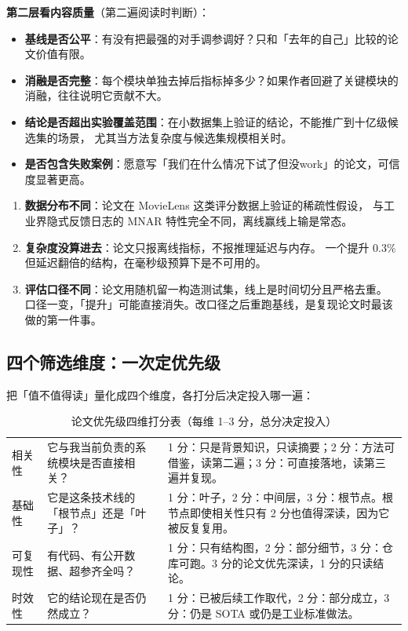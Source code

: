 \textbf{第二层看内容质量}（第二遍阅读时判断）：

\begin{itemize}
  \item \textbf{基线是否公平}：有没有把最强的对手调参调好？只和「去年的自己」比较的论文价值有限。
  \item \textbf{消融是否完整}：每个模块单独去掉后指标掉多少？如果作者回避了关键模块的消融，往往说明它贡献不大。
  \item \textbf{结论是否超出实验覆盖范围}：在小数据集上验证的结论，不能推广到十亿级候选集的场景，
        尤其当方法复杂度与候选集规模相关时。
  \item \textbf{是否包含失败案例}：愿意写「我们在什么情况下试了但没work」的论文，可信度显著更高。
\end{itemize}

\begin{pitfall}
\begin{enumerate}
  \item \textbf{数据分布不同}：论文在 MovieLens 这类评分数据上验证的稀疏性假设，
        与工业界隐式反馈日志的 MNAR 特性完全不同，离线赢线上输是常态。
  \item \textbf{复杂度没算进去}：论文只报离线指标，不报推理延迟与内存。
        一个提升 0.3\%  但延迟翻倍的结构，在毫秒级预算下是不可用的。
  \item \textbf{评估口径不同}：论文用随机留一构造测试集，线上是时间切分且严格去重。
        口径一变，「提升」可能直接消失。改口径之后重跑基线，是复现论文时最该做的第一件事。
\end{enumerate}
\end{pitfall}

\subsection{四个筛选维度：一次定优先级}

把「值不值得读」量化成四个维度，各打分后决定投入哪一遍：

\begin{table}[htbp]
\centering
\caption{论文优先级四维打分表（每维 1--3 分，总分决定投入）}
\label{tab:paper-score}
\small
\begin{tabularx}{\textwidth}{L{2.0cm} L{4.2cm} Y}
\toprule
{} &  &  \\
\midrule
相关性 & 它与我当前负责的系统模块是否直接相关？ &
1 分：只是背景知识，只读摘要；2 分：方法可借鉴，读第二遍；3 分：可直接落地，读第三遍并复现。 \\
\midrule
基础性 & 它是这条技术线的「根节点」还是「叶子」？ &
1 分：叶子，2 分：中间层，3 分：根节点。根节点即使相关性只有 2 分也值得深读，因为它被反复复用。 \\
\midrule
可复现性 & 有代码、有公开数据、超参齐全吗？ &
1 分：只有结构图，2 分：部分细节，3 分：仓库可跑。3 分的论文优先深读，1 分的只读结论。 \\
\midrule
时效性 & 它的结论现在是否仍然成立？ &
1 分：已被后续工作取代，2 分：部分成立，3 分：仍是 SOTA 或仍是工业标准做法。 \\
\bottomrule
\end{tabularx}
\end{table}

